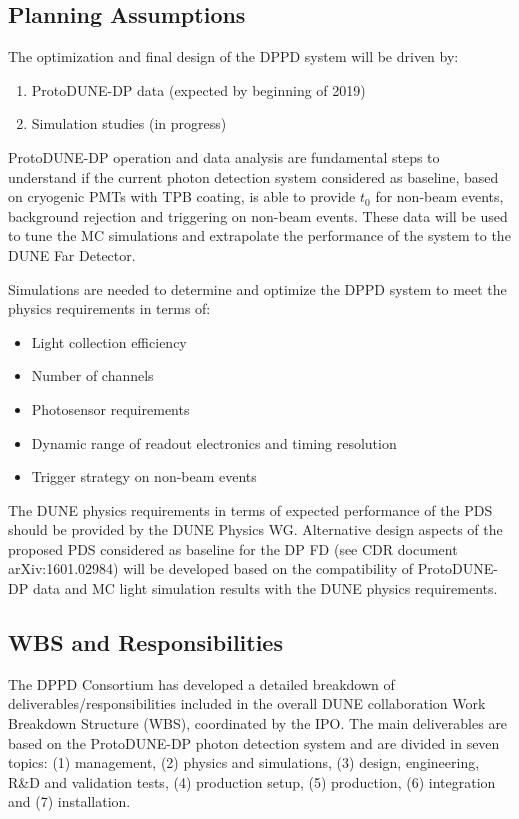 \subsection{Planning Assumptions}
\label{sec:fddp-pd-12.2}

The optimization and final design of the DPPD system will be driven by:
\begin{enumerate}
\item ProtoDUNE-DP data (expected by beginning of 2019)
\item Simulation studies (in progress)
\end{enumerate}

ProtoDUNE-DP operation and data analysis are fundamental steps to understand if the current photon detection system considered as baseline, based on cryogenic PMTs with TPB coating, is able to provide $t_0$ for non-beam events, background rejection and triggering on non-beam events. These data will be used to tune the MC simulations and extrapolate the performance of the system to the DUNE Far Detector. 

Simulations are needed to determine and optimize the DPPD system to meet the physics requirements in terms of:
\begin{itemize}
\item Light collection efficiency
\item Number of channels
\item Photosensor requirements
\item Dynamic range of readout electronics and timing resolution
\item Trigger strategy on non-beam events
\end{itemize}

The DUNE physics requirements in terms of expected performance of the PDS should be provided by the DUNE Physics WG. Alternative design aspects of the proposed PDS considered as baseline for the DP FD (see CDR document arXiv:1601.02984) will be developed based on the compatibility of ProtoDUNE-DP data and MC light simulation results with the DUNE physics requirements.

\subsection{WBS and Responsibilities}
\label{sec:fddp-pd-12.3}

The DPPD Consortium has developed a detailed breakdown of deliverables/responsibilities included in the overall DUNE collaboration Work Breakdown Structure (WBS), coordinated by the IPO. The main deliverables are based on the ProtoDUNE-DP photon detection system and are divided in seven topics: (1) management, (2) physics and simulations, (3) design, engineering, R\&D and validation tests, (4) production setup, (5) production, (6) integration and (7) installation.

